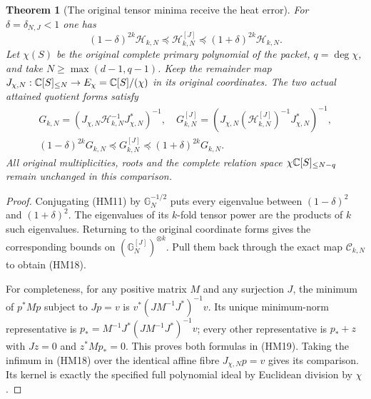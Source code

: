 \documentclass[11pt]{article}
\newtheorem{theorem}{Theorem}[section]
\begin{document}
\begin{theorem}[The original tensor minima receive the heat error]
For $\delta=\delta_{N,J}<1$ one has
\begin{equation}\tag{HM18}
 (1-\delta)^{2k}\mathcal H_{k,N}
 \preceq\mathcal H_{k,N}^{[J]}
 \preceq(1+\delta)^{2k}\mathcal H_{k,N}.
\end{equation}
Let $\chi(S)$ be the original complete primary polynomial of the packet,
$q=\deg\chi$, and take $N\ge\max(d-1,q-1)$. Keep the remainder map
$J_{\chi,N}:\mathbb C[S]_{\le N}\to E_\chi=\mathbb C[S]/(\chi)$ in its original
coordinates. The two actual attained quotient forms satisfy
\begin{equation}\tag{HM19}
 \begin{gathered}
 G_{k,N}=(J_{\chi,N}\mathcal H_{k,N}^{-1}J_{\chi,N}^*)^{-1},\quad
 G_{k,N}^{[J]}=(J_{\chi,N}(\mathcal H_{k,N}^{[J]})^{-1}
                                                   J_{\chi,N}^*)^{-1},\\
 (1-\delta)^{2k}G_{k,N}\preceq G_{k,N}^{[J]}
                                      \preceq(1+\delta)^{2k}G_{k,N}.
 \end{gathered}
\end{equation}
All original multiplicities, roots and the complete relation space
$\chi\mathbb C[S]_{\le N-q}$ remain unchanged in this comparison.
\end{theorem}
\begin{proof}
Conjugating (HM11) by $\mathbb G_N^{-1/2}$ puts every eigenvalue
between $(1-\delta)^2$ and $(1+\delta)^2$. The eigenvalues of its
$k$-fold tensor power are the products of $k$ such eigenvalues. Returning
to the original coordinate forms gives the corresponding bounds on
$(\mathbb G_N^{[J]})^{\otimes k}$. Pull them back through the exact
map $\mathcal C_{k,N}$ to obtain (HM18).

For completeness, for any positive matrix $M$ and any surjection $J$,
the minimum of $p^*Mp$ subject to $Jp=v$ is
$v^*(JM^{-1}J^*)^{-1}v$. Its unique minimum-norm representative is
$p_*=M^{-1}J^*(JM^{-1}J^*)^{-1}v$; every other representative is
$p_*+z$ with $Jz=0$ and $z^*Mp_*=0$. This proves both formulas in
(HM19). Taking the infimum in (HM18) over the identical affine fibre
$J_{\chi,N}p=v$ gives its comparison. Its kernel is exactly the
specified full polynomial ideal by Euclidean division by $\chi$.
\end{proof}
\end{document}
